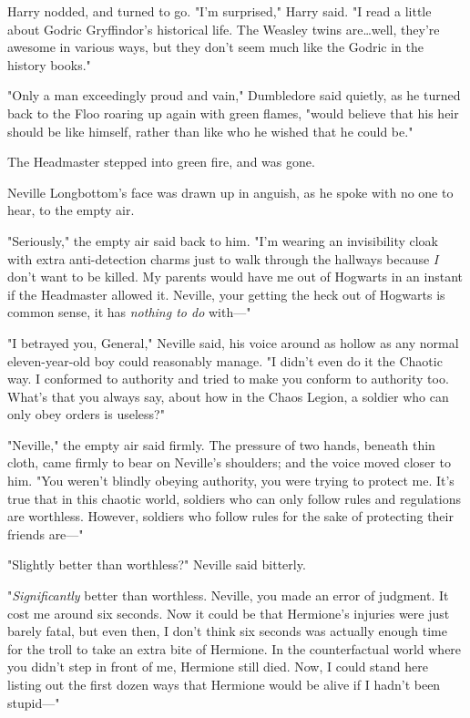 Harry nodded, and turned to go. "I'm surprised," Harry said. "I read a little
about Godric Gryffindor's historical life. The Weasley twins are…well,
they're awesome in various ways, but they don't seem much like the Godric in
the history books."

"Only a man exceedingly proud and vain," Dumbledore said quietly, as he turned
back to the Floo roaring up again with green flames, "would believe that his
heir should be like himself, rather than like who he wished that he could be."

The Headmaster stepped into green fire, and was gone.

Neville Longbottom's face was drawn up in anguish, as he spoke with no one to
hear, to the empty air.

"Seriously," the empty air said back to him. "I'm wearing an invisibility cloak
with extra anti-detection charms just to walk through the hallways because
\emph{I} don't want to be killed. My parents would have me out of Hogwarts in
an instant if the Headmaster allowed it. Neville, your getting the heck out of
Hogwarts is common sense, it has \emph{nothing to do} with—"

"I betrayed you, General," Neville said, his voice around as hollow as any
normal eleven-year-old boy could reasonably manage. "I didn't even do it the
Chaotic way. I conformed to authority and tried to make you conform to
authority too. What's that you always say, about how in the Chaos Legion, a
soldier who can only obey orders is useless?"

"Neville," the empty air said firmly. The pressure of two hands, beneath thin
cloth, came firmly to bear on Neville's shoulders; and the voice moved closer
to him. "You weren't blindly obeying authority, you were trying to protect me.
It's true that in this chaotic world, soldiers who can only follow rules and
regulations are worthless. However, soldiers who follow rules for the sake of
protecting their friends are—"

"Slightly better than worthless?" Neville said bitterly.

"\emph{Significantly} better than worthless. Neville, you made an error of
judgment. It cost me around six seconds. Now it could be that Hermione's
injuries were just barely fatal, but even then, I don't think six seconds was
actually enough time for the troll to take an extra bite of Hermione. In the
counterfactual world where you didn't step in front of me, Hermione still died.
Now, I could stand here listing out the first dozen ways that Hermione would be
alive if I hadn't been stupid—"

